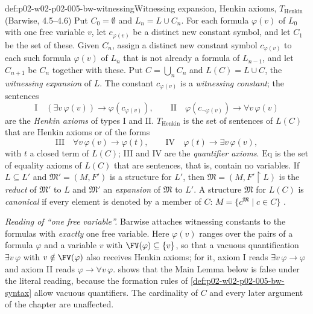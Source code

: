 \begin{hbdefinition}{def:p02-w02-p02-005-bw-witnessing}{Witnessing expansion, Henkin axioms, \(T_{\mathrm{Henkin}}\) (Barwise, 4.5--4.6)}
Put \(C_0=\emptyset\) and \(L_n=L\cup C_n\).  For each formula
\(\varphi(v)\) of \(L_0\) with one free variable \(v\), let
\(c_{\varphi(v)}\) be a distinct new constant symbol, and let \(C_1\) be the
set of these.  Given \(C_n\), assign a distinct new constant symbol
\(c_{\varphi(v)}\) to each such formula \(\varphi(v)\) of \(L_n\) that is
not already a formula of \(L_{n-1}\), and let \(C_{n+1}\) be \(C_n\)
together with these.  Put \(C=\bigcup_nC_n\) and \(L(C)=L\cup C\), the
\emph{witnessing expansion} of \(L\).  The constant \(c_{\varphi(v)}\) is a
\emph{witnessing constant}; the sentences
\[
\text{I}\quad(\exists v\,\varphi(v))\to\varphi(c_{\varphi(v)}),\qquad
\text{II}\quad\varphi(c_{\neg\varphi(v)})\to\forall v\,\varphi(v)
\]
are the \emph{Henkin axioms} of types I and II.  \(T_{\mathrm{Henkin}}\)
is the set of sentences of \(L(C)\) that are Henkin axioms or of the forms
\[
\text{III}\quad\forall v\,\varphi(v)\to\varphi(t),\qquad
\text{IV}\quad\varphi(t)\to\exists v\,\varphi(v),
\]
with \(t\) a closed term of \(L(C)\); III and IV are the \emph{quantifier
axioms}.  \(\mathrm{Eq}\) is the set of equality axioms of \(L(C)\) that
are sentences, that is, contain no variables.  If \(L\subseteq L'\) and
\(\mathfrak M'=(M,F')\) is a structure for \(L'\), then
\(\mathfrak M=(M,F'\restriction L)\) is the \emph{reduct} of
\(\mathfrak M'\) to \(L\) and \(\mathfrak M'\) an \emph{expansion} of
\(\mathfrak M\) to \(L'\).  A structure \(\mathfrak M\) for \(L(C)\) is
\emph{canonical} if every element is denoted by a member of \(C\):
\(M=\{c^{\mathfrak M}\mid c\in C\}\)
\cite[ch.~A.1, \S4, pp.~29--31]{Barwise1977FirstOrder}.

\emph{Reading of ``one free variable''.}  Barwise attaches witnessing
constants to the formulas with \emph{exactly} one free variable.  Here
\(\varphi(v)\) ranges over the pairs of a formula \(\varphi\) and a
variable \(v\) with \(\FV(\varphi)\subseteq\{v\}\), so that a vacuous
quantification \(\exists v\,\varphi\) with \(v\notin\FV(\varphi)\) also
receives Henkin axioms; for it, axiom I reads
\(\exists v\,\varphi\to\varphi\) and axiom II reads
\(\varphi\to\forall v\,\varphi\).  
shows that the Main Lemma below is false under the literal reading,
because the formation rules of \cref{def:p02-w02-p02-005-bw-syntax} allow
vacuous quantifiers.  The cardinality of \(C\) and every later argument of
the chapter are unaffected.
\end{hbdefinition}


